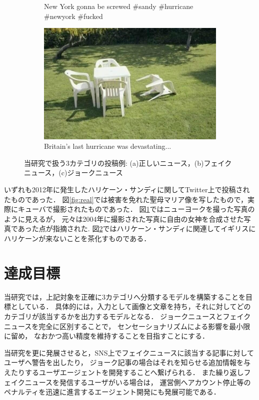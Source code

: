 \begin{figure}[ht]
\begin{subfigure}[b]{0.45\textwidth}
        \caption{New York gonna be screwed \#sandy \#hurricane \#newyork \#fucked}
        \label{fig:fake}
    \end{subfigure}
    \bigskip 
    \centering
    \begin{subfigure}[b]{0.45\textwidth}
        \includegraphics[width=\linewidth]{images/humor_example.jpg}
        \caption{Britain's last hurricane was devastating...}
        \label{fig:humor}
    \end{subfigure}
    \caption{当研究で扱う3カテゴリの投稿例: (a)正しいニュース，(b)フェイクニュース，(c)ジョークニュース}
    \label{fig:examples}
\end{figure}

いずれも2012年に発生したハリケーン・サンディに関してTwitter上で投稿されたものであった．
図\ref{fig:real}では被害を免れた聖母マリア像を写したもので，実際にキューバで撮影されたものであった．
図\ref{fig:fake}ではニューヨークを撮った写真のように見えるが，
元々は2004年に撮影された写真に自由の女神を合成させた写真であった点が指摘された\cite{harmanci_2012}.
図\ref{fig:humor}ではハリケーン・サンディに関連してイギリスにハリケーンが来ないことを茶化すものである．

%
\section{達成目標}
当研究では，上記対象を正確に3カテゴリへ分類するモデルを構築することを目標としている．
具体的には，入力として画像と文章を持ち，それに対してどのカテゴリが該当するかを出力するモデルとなる．
ジョークニュースとフェイクニュースを完全に区別することで，
センセーショナリズムによる影響を最小限に留め，
なおかつ高い精度を維持することを目指すことにする．

当研究を更に発展させると，SNS上でフェイクニュースに該当する記事に対してユーザへ警告を出したり，
ジョーク記事の場合はそれを知らせる追加情報を与えたりするユーザエージェントを開発することへ繋げられる．
また繰り返しフェイクニュースを発信するユーザがいる場合は，
運営側へアカウント停止等のペナルティを迅速に進言するエージェント開発にも発展可能である．

%